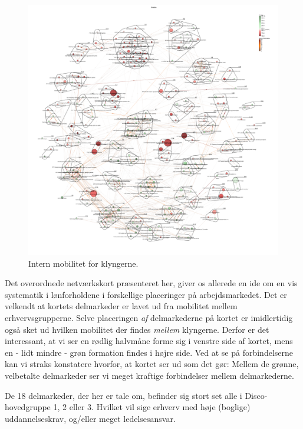 %
\begin{figure}[H]
\begin{center}
  \caption{Intern mobilitet for klyngerne.}
  \label{fig_analyse_deskriptivt_kort_timelon}
  \includegraphics[width=1.0\textwidth]{fig/netvaerkskort/kort_timelon.pdf}
\end{center}
\end{figure}
\restoregeometry
%

Det overordnede netværkskort præsenteret her, giver os allerede en ide om en vis systematik i lønforholdene i forskellige placeringer på arbejdsmarkedet. Det er velkendt at kortets delmarkeder er lavet ud fra mobilitet mellem erhvervsgrupperne. Selve placeringen \emph{af} delmarkederne på kortet er imidlertidig også sket ud hvilken mobilitet der findes \emph{mellem} klyngerne. Derfor er det interessant, at vi ser en rødlig halvmåne forme sig i venstre side af kortet, mens en - lidt mindre - grøn formation findes i højre side. Ved at se på forbindelserne kan vi straks konstatere hvorfor, at kortet ser ud som det gør: Mellem de grønne, velbetalte delmarkeder ser vi meget kraftige forbindelser mellem delmarkederne. 

De 18 delmarkeder, der her er tale om, befinder sig stort set alle i Disco-hovedgruppe 1, 2 eller 3. Hvilket vil sige erhverv med høje (boglige) uddannelseskrav, og/eller meget ledelsesansvar. 

